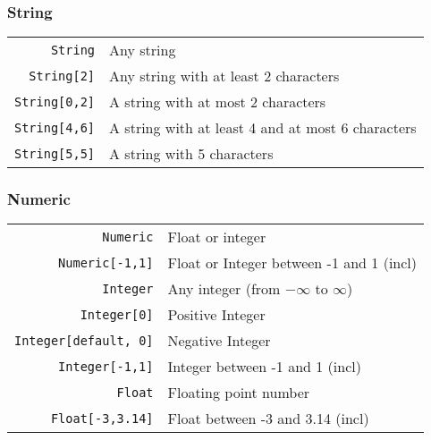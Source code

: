 \begin{frame}\frametitle{String}
\begin{table}
\begin{tabular}{rl}
\texttt{String} & Any string \\\pause
\texttt{String[2]} & Any string with at least 2 characters \\\pause
\texttt{String[0,2]} & A string with at most 2 characters \\\pause
\texttt{String[4,6]} & A string with at least 4 and at most 6 characters \\\pause
\texttt{String[5,5]} & A string with 5 characters
\end{tabular}
\end{table}
\end{frame}
\begin{frame}\frametitle{Numeric}
    \begin{table}
        \begin{tabular}{rl}
\texttt{Numeric} & Float or integer \\\pause
\texttt{Numeric[-1,1]} & Float or Integer between -1 and 1 (incl) \\\pause
\texttt{Integer} & Any integer (from $-\infty$ to $\infty$) \\\pause
\texttt{Integer[0]} & Positive Integer \\\pause
\texttt{Integer[default, 0]} & Negative Integer \\\pause
\texttt{Integer[-1,1]} & Integer between -1 and 1 (incl)  \\\pause
\texttt{Float} & Floating point number \\\pause
\texttt{Float[-3,3.14]} & Float between -3 and 3.14 (incl) \\
\end{tabular}
    \end{table}
\end{frame}
